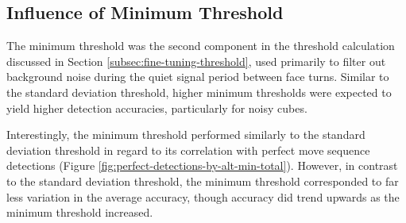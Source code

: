\subsection{Influence of Minimum Threshold}
\label{subsec:influence-alt-min}

The minimum threshold was the second component in the threshold
calculation discussed in Section \ref{subsec:fine-tuning-threshold},
used primarily to filter out background noise during the quiet signal
period between face turns. Similar to the standard deviation threshold,
higher minimum thresholds were expected to yield higher detection
accuracies, particularly for noisy cubes.

Interestingly, the minimum threshold performed similarly to the
standard deviation threshold in regard to its correlation with perfect
move sequence detections (Figure
\ref{fig:perfect-detections-by-alt-min-total}). However, in contrast to
the standard deviation threshold, the minimum threshold corresponded to
far less variation in the average accuracy, though accuracy did trend
upwards as the minimum threshold increased.

